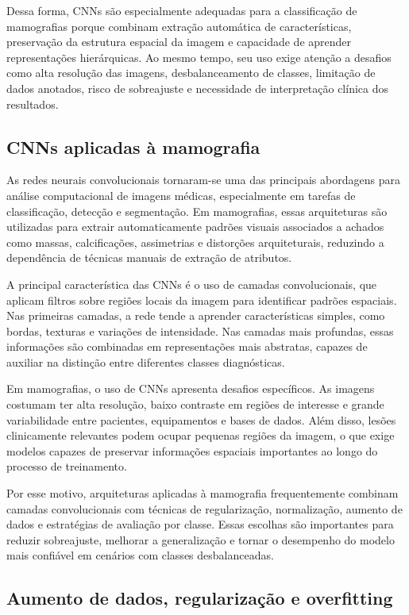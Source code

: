 \documentclass[
    12pt,
    openright,
    oneside,
    a4paper,
    english,
    brazil
]{abntex2}
\begin{document}
Dessa forma, CNNs são especialmente adequadas para a classificação de mamografias porque combinam extração automática de características, preservação da estrutura espacial da imagem e capacidade de aprender representações hierárquicas. Ao mesmo tempo, seu uso exige atenção a desafios como alta resolução das imagens, desbalanceamento de classes, limitação de dados anotados, risco de sobreajuste e necessidade de interpretação clínica dos resultados.

\subsection{CNNs aplicadas à mamografia}

As redes neurais convolucionais tornaram-se uma das principais abordagens para análise computacional de imagens médicas, especialmente em tarefas de classificação, detecção e segmentação. Em mamografias, essas arquiteturas são utilizadas para extrair automaticamente padrões visuais associados a achados como massas, calcificações, assimetrias e distorções arquiteturais, reduzindo a dependência de técnicas manuais de extração de atributos.

A principal característica das CNNs é o uso de camadas convolucionais, que aplicam filtros sobre regiões locais da imagem para identificar padrões espaciais. Nas primeiras camadas, a rede tende a aprender características simples, como bordas, texturas e variações de intensidade. Nas camadas mais profundas, essas informações são combinadas em representações mais abstratas, capazes de auxiliar na distinção entre diferentes classes diagnósticas.

Em mamografias, o uso de CNNs apresenta desafios específicos. As imagens costumam ter alta resolução, baixo contraste em regiões de interesse e grande variabilidade entre pacientes, equipamentos e bases de dados. Além disso, lesões clinicamente relevantes podem ocupar pequenas regiões da imagem, o que exige modelos capazes de preservar informações espaciais importantes ao longo do processo de treinamento.

Por esse motivo, arquiteturas aplicadas à mamografia frequentemente combinam camadas convolucionais com técnicas de regularização, normalização, aumento de dados e estratégias de avaliação por classe. Essas escolhas são importantes para reduzir sobreajuste, melhorar a generalização e tornar o desempenho do modelo mais confiável em cenários com classes desbalanceadas.

\subsection{Aumento de dados, regularização e overfitting}
\label{subsec:aumento_regularizacao_overfitting}
\end{document}

